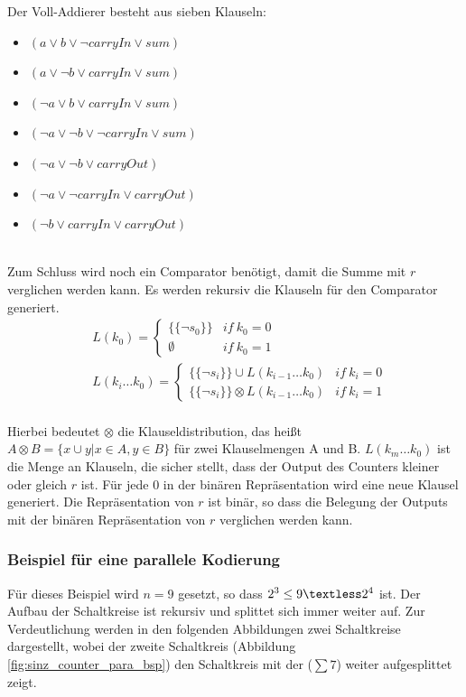 \documentclass[a4,abstract=on]{scrartcl}
\begin{document}
Der Voll-Addierer besteht aus sieben Klauseln:
\begin{itemize}
\item[] $(a \vee b \vee \neg carryIn \vee sum)$
\item[] $( a \vee \neg b \vee carryIn \vee sum)$
\item[] $(\neg a \vee b \vee carryIn \vee sum )$
\item[] $(\neg a \vee \neg b \vee \neg carryIn \vee sum)$
\item[] $(\neg a \vee \neg b \vee carryOut)$
\item[] $(\neg a \vee \neg carryIn \vee carryOut)$
\item[] $(\neg b \vee carryIn \vee carryOut)$
\end{itemize}
\ \\
Zum Schluss wird noch ein Comparator benötigt, damit die Summe mit $r$ verglichen werden kann. Es werden rekursiv die Klauseln für den Comparator generiert.
\begin{align*}
&L(k_0) = \begin{cases} \{\{\neg s_0\}\} & if{~}k_0 = 0\\ \emptyset & if{~}k_0=1\end{cases}\\
&L(k_i \dots k_0) = \begin{cases} \{\{\neg s_i\}\}\cup L(k_{i-1} \dots k_0) & if{~}k_i = 0\\  \{\{\neg s_i\}\}\otimes L(k_{i-1} \dots k_0) & if{~}k_i = 1\end{cases}
\end{align*}
\ \\
Hierbei bedeutet $\otimes$ die Klauseldistribution, das heißt $A \otimes B = \{x \cup y|x \in A, y \in B\}$ für zwei Klauselmengen A und B. $L(k_{m} \dots k_0)$ ist die Menge an Klauseln, die sicher stellt, dass der Output des Counters kleiner oder gleich $r$ ist. Für jede $0$ in der binären Repräsentation wird eine neue Klausel generiert.
Die Repräsentation von $r$ ist binär, so dass die Belegung der Outputs mit der binären Repräsentation von $r$ verglichen werden kann.

\subsubsection*{Beispiel für eine parallele Kodierung}
Für dieses Beispiel wird $n=9$ gesetzt, so dass $2^3 \leq 9 \textless 2^4$ ist. Der Aufbau der Schaltkreise ist rekursiv und splittet sich immer weiter auf. Zur Verdeutlichung werden  in den folgenden Abbildungen zwei Schaltkreise dargestellt, wobei der zweite Schaltkreis (Abbildung \ref{fig:sinz_counter_para_bsp}) den Schaltkreis mit der ($\sum 7$) weiter aufgesplittet zeigt.
\end{document}
